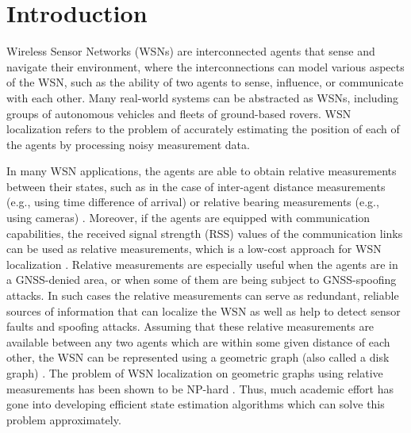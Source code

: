 \documentclass[twocolumn]{article}
\theoremstyle{plain}
\theoremstyle{definition}
\theoremstyle{definition}
\theoremstyle{remark}
\begin{document}
\section{Introduction}
\label{sec:introduction}
Wireless Sensor Networks (WSNs) are interconnected agents that sense and navigate their environment, where the interconnections can model various aspects of the WSN, such as the ability of two agents to sense, influence, or communicate with each other. Many real-world systems can be abstracted as WSNs, including groups of autonomous vehicles and fleets of ground-based rovers.
WSN localization refers to the problem of accurately estimating the position of each of the agents by processing noisy measurement data. 

In many WSN applications, the agents are able to obtain relative measurements between their states, such as in the case of inter-agent distance measurements (e.g., using time difference of arrival) or relative bearing measurements (e.g., using cameras) \cite{iet_loc_distance, iet_relative_bearing, zhao2019bearing}. Moreover, if the agents are equipped with communication capabilities, the received signal strength (RSS) values of the communication links can be used as relative measurements, which is a low-cost approach for WSN localization \cite{RSS2019efficient}. 
Relative measurements are especially useful when the agents are in a GNSS-denied area, or when some of them are being subject to GNSS-spoofing attacks. In such cases the relative measurements can serve as redundant, reliable sources of information that can localize the WSN as well as help to detect sensor faults and spoofing attacks. 
Assuming that these relative measurements are available between any two agents which are within some given distance of each other, the WSN can be represented using a geometric graph (also called a disk graph) \cite{bdo_localization2007}. 
The problem of WSN localization on geometric graphs using relative measurements has been shown to be NP-hard \cite{aspnes2006theory}. Thus, much academic effort has gone into developing efficient state estimation algorithms which can solve this problem approximately.
\end{document}
